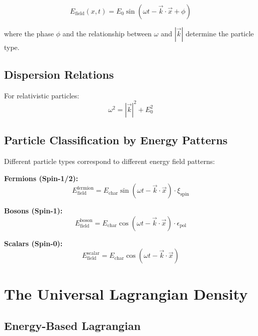\documentclass[12pt,a4paper]{report}
\begin{document}
	\begin{equation}
		E_{\text{field}}(x,t) = E_0 \sin(\omega t - \vec{k} \cdot \vec{x} + \phi)
	\end{equation}
	
	where the phase $\phi$ and the relationship between $\omega$ and $|\vec{k}|$ determine the particle type.
	
	\subsection{Dispersion Relations}
	
	For relativistic particles:
	\begin{equation}
		\omega^2 = |\vec{k}|^2 + E_0^2
	\end{equation}
	
	\subsection{Particle Classification by Energy Patterns}
	\label{subsec:energy_patterns}
	
	Different particle types correspond to different energy field patterns:
	
	\textbf{Fermions (Spin-1/2):}
	\begin{equation}
		E_{\text{field}}^{\text{fermion}} = E_{\text{char}} \sin(\omega t - \vec{k} \cdot \vec{x}) \cdot \xi_{\text{spin}}
	\end{equation}
	
	\textbf{Bosons (Spin-1):}
	\begin{equation}
		E_{\text{field}}^{\text{boson}} = E_{\text{char}} \cos(\omega t - \vec{k} \cdot \vec{x}) \cdot \epsilon_{\text{pol}}
	\end{equation}
	
	\textbf{Scalars (Spin-0):}
	\begin{equation}
		E_{\text{field}}^{\text{scalar}} = E_{\text{char}} \cos(\omega t - \vec{k} \cdot \vec{x})
	\end{equation}
	
	\section{The Universal Lagrangian Density}
	\label{sec:universal_lagrangian}
	
	\subsection{Energy-Based Lagrangian}
	\label{subsec:energy_based_lagrangian}
	
\end{document}

